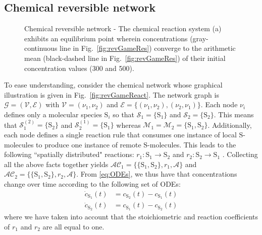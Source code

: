 \documentclass[journal]{IEEEtran}
\newcommand{\mol}[1]{\ensuremath{\textrm{#1}}}
\begin{document}
{\subsection{Chemical reversible network}
\begin{figure}[t]
 \centering
\caption{{Chemical reversible network - The chemical reaction system (a) exhibits an equilibrium point wherein concentrations (gray-continuous line in Fig.~\ref{fig:revGameRes}) converge to the arithmetic mean (black-dashed line in Fig.~\ref{fig:revGameRes}) of their initial concentration values (300 and 500).}}
\label{fig:revGame}
\end{figure}
To ease understanding, consider the chemical {network} whose graphical illustration is given in Fig.~\ref{fig:revGameReact}. The network graph is $\mathcal G = (\mathcal V,\mathcal E)$ with $\mathcal V= (\nu_1,\nu_2)$ and $\mathcal E = \{(\nu_1,\nu_2), (\nu_2,\nu_1)\}$. Each node $\nu_i$ defines only a molecular species $\mol{S}_i$ so that $\mathcal{S}_1 = \{\mol{S}_1\}$ and $\mathcal{S}_2 = \{\mol{S}_2\}$. This means that $\mathcal{S}_1^{(2)} = \{\mol{S}_2\}$ and $\mathcal{S}_2^{(1)} = \{\mol{S}_1\}$ whereas $\mathcal M_1 = \mathcal M_2 = \{\mol{S}_1,\mol{S}_2\}$. Additionally, each node defines a single reaction rule that consumes one instance of local $\mol{S}$-molecules to produce one instance of remote $\mol{S}$-molecules. {This leads to the following {``spatially distributed"} reactions: $r_{1}: \mol{S}_1 {\longrightarrow}  \mol{S}_2 $ and $r_{2}: \mol{S}_2	{\longrightarrow}  \mol{S}_1$ }. Collecting all the above facts together yields $\mathcal{AC}_1=\{\{\mol{S}_1,\mol{S}_2\}, r_1, \mathcal A\}$ and $\mathcal{AC}_2=\{\{\mol{S}_1,\mol{S}_2\}, r_2, \mathcal A\}$. From \eqref{eq:ODEs}, we thus have that concentrations change over time according to the following set of ODEs:
\begin{subequations} \label{eq:ChemGameODE}
\begin{align}
	 \dot{c}_{\mol{S}_1}(t) &= c_{\mol{S}_2}(t) - c_{\mol{S}_1}(t)\label{eq:ChemGameODE1}\\
	 \dot{c}_{\mol{S}_2}(t) &= c_{\mol{S}_1}(t) - c_{\mol{S}_2}(t) \label{eq:ChemGameODE2}
 \end{align}
 \end{subequations}
{where we have taken into account that the stoichiometric and reaction coefficients of $r_1$ and $r_2$ are all equal to one.}

}
\end{document}
